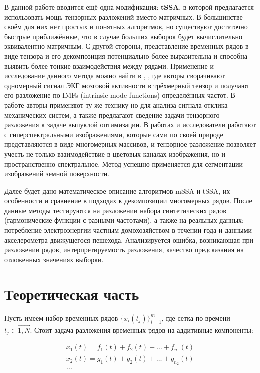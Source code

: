 	    В данной работе вводится ещё одна модификация: \textbf{tSSA}, в которой предлагается использовать мощь тензорных разложений вместо матричных. В большинстве своём для них нет простых и понятных алгоритмов, но существуют достаточно быстрые приближённые, что в случае больших выборок будет вычислительно эквивалентно матричным. С другой стороны, представление временных рядов в виде тензора и его декомпозиция потенциально более выразительна и способна  выявить более тонкие взаимодействия между рядами. Применение и исследование данного метода можно найти в \cite{6661921}, \cite{6834801}, где авторы сворачивают одномерный сигнал ЭКГ мозговой активности в трёхмерный тензор и получают его разложение по IMFs (intrinsic mode functions) определённых частот. В работе \cite{app7040418} авторы применяют ту же технику но для анализа сигнала отклика механических систем, а также предлагают сведение задачи тензорного разложения к задаче выпуклой оптимизации. В работах \cite{10122507} и \cite{FU2023115} исследователи работают с \href{https://en.wikipedia.org/wiki/Hyperspectral_imaging}{гиперспектральными изображениями}, которые сами по своей природе представляются в виде многомерных массивов, и тензорное разложение позволяет учесть не только взаимодействие в цветовых каналах изображения, но и пространственно-спектральное. Метод успешно применяется для сегментации изображений земной поверхности. 
	    
	    Далее будет дано математическое описание алгоритмов mSSA и tSSA, их особенности и сравнение в подходах к декомпозиции многомерных рядов. После данные методы тестируются на разложении набора синтетических рядов (гармонические функции с разными частотами), а также на реальных данных: потребление электроэнергии частным домохозяйством в течении года и данными акселерометра движущегося пешехода. Анализируется ошибка, возникающая при разложении рядов, интерпретируемость разложения, качество предсказания на отложенных значениях выборки. 
	    
	    \section*{Теоретическая часть}
	    
	    	Пусть имеем набор временных рядов $ \{x_i(t_j)\}_{i = 1}^{m} $, где сетка по времени $ t_j \in \overrightarrow{1, N} $. Стоит задача разложения временных рядов на аддитивные компоненты: 
	    	
	    	\begin{gather*}
	    		x_1(t) = f_1(t) + f_2(t) + \ldots + f_{n_1}(t) \\
	    		x_2(t) = g_1(t) + g_2(t) + \ldots + g_{n_2}(t) \\
	    			   ...
	    	\end{gather*}
	    	

